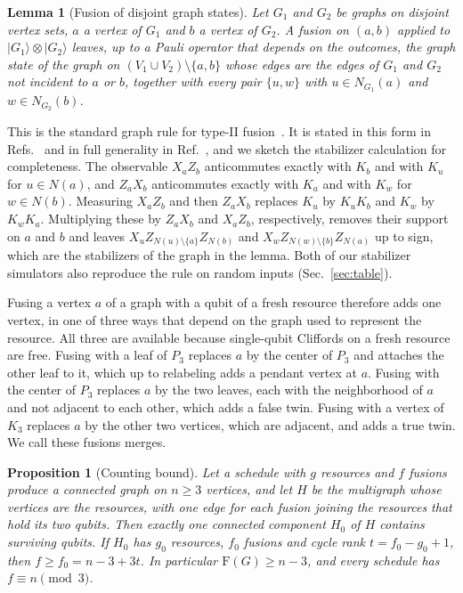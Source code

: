 \documentclass[aps,pra,onecolumn,superscriptaddress,nofootinbib,longbibliography]{revtex4-2}
\theoremstyle{plain}
\newtheorem{lemma}[theorem]{Lemma}
\newtheorem{proposition}[theorem]{Proposition}
\theoremstyle{remark}
\newcommand{\F}{\mathrm{F}}
\newcommand{\nbr}{N}
\begin{document}
\begin{lemma}[Fusion of disjoint graph states]\label{lem:merge}
Let $G_1$ and $G_2$ be graphs on disjoint vertex sets, $a$ a vertex of $G_1$ and $b$ a vertex of $G_2$.
A fusion on $(a,b)$ applied to $|G_1\rangle\otimes|G_2\rangle$ leaves, up to a Pauli operator that
depends on the outcomes, the graph state of the graph on $(V_1\cup V_2)\setminus\{a,b\}$ whose edges are
the edges of $G_1$ and $G_2$ not incident to $a$ or $b$, together with every pair $\{u,w\}$ with
$u\in\nbr_{G_1}(a)$ and $w\in\nbr_{G_2}(b)$.
\end{lemma}

This is the standard graph rule for type-II fusion~\cite{Browne2005resource}. It is stated in this form in
Refs.~\cite{Zaidi2015near,Lee2023graph} and in full generality in Ref.~\cite{Lobl2025transforming}, and we
sketch the stabilizer calculation for completeness. The observable $X_aZ_b$ anticommutes exactly with $K_b$
and with $K_u$ for $u\in\nbr(a)$, and $Z_aX_b$ anticommutes exactly with $K_a$ and with $K_w$ for
$w\in\nbr(b)$. Measuring $X_aZ_b$ and then $Z_aX_b$ replaces $K_u$ by $K_uK_b$ and $K_w$ by $K_wK_a$.
Multiplying these by $Z_aX_b$ and $X_aZ_b$, respectively, removes their support on $a$ and $b$ and leaves
$X_u Z_{\nbr(u)\setminus\{a\}}Z_{\nbr(b)}$ and $X_w Z_{\nbr(w)\setminus\{b\}}Z_{\nbr(a)}$ up to sign, which
are the stabilizers of the graph in the lemma. Both of our stabilizer simulators also reproduce the rule on
random inputs (Sec.~\ref{sec:table}).

Fusing a vertex $a$ of a graph with a qubit of a fresh resource therefore adds one vertex, in one of three
ways that depend on the graph used to represent the resource. All three are available because
single-qubit Cliffords on a fresh resource are free. Fusing with a leaf of $P_3$ replaces $a$ by the center
of $P_3$ and attaches the other leaf to it, which up to relabeling adds a pendant vertex at $a$. Fusing
with the center of $P_3$ replaces $a$ by the two leaves, each with the neighborhood of $a$ and not adjacent
to each other, which adds a false twin. Fusing with a vertex of $K_3$ replaces $a$ by the other two
vertices, which are adjacent, and adds a true twin. We call these fusions merges.

\begin{proposition}[Counting bound]\label{prop:count}
Let a schedule with $g$ resources and $f$ fusions produce a connected graph on $n\ge 3$ vertices, and let
$H$ be the multigraph whose vertices are the resources, with one edge for each fusion joining the
resources that hold its two qubits. Then exactly one connected component $H_0$ of $H$ contains surviving
qubits. If $H_0$ has $g_0$ resources, $f_0$ fusions and cycle rank $t=f_0-g_0+1$, then $f\ge f_0=n-3+3t$.
In particular $\F(G)\ge n-3$, and every schedule has $f\equiv n\pmod 3$.
\end{proposition}
\end{document}
